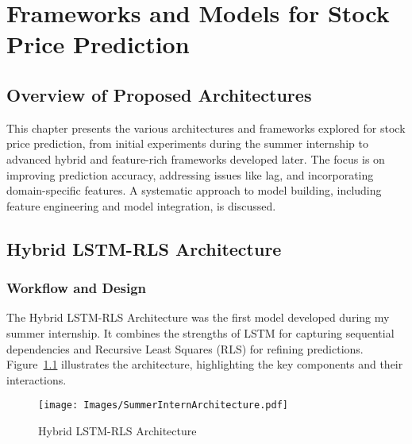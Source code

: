\chapter{Frameworks and Models for Stock Price Prediction}

\section{Overview of Proposed Architectures}
This chapter presents the various architectures and frameworks explored for stock price prediction, from initial experiments during the summer internship to advanced hybrid and feature-rich frameworks developed later. The focus is on improving prediction accuracy, addressing issues like lag, and incorporating domain-specific features. A systematic approach to model building, including feature engineering and model integration, is discussed.

\section{Hybrid LSTM-RLS Architecture}

\subsection{Workflow and Design}
The Hybrid LSTM-RLS Architecture was the first model developed during my summer internship. It combines the strengths of LSTM for capturing sequential dependencies and Recursive Least Squares (RLS) for refining predictions. Figure~\ref{fig:summerarch} illustrates the architecture, highlighting the key components and their interactions.

\begin{figure}[h!]
    \centering
    \texttt{[image: Images/SummerInternArchitecture.pdf]} %
    \caption{Hybrid LSTM-RLS Architecture}
    \label{fig:summerarch}
\end{figure}

